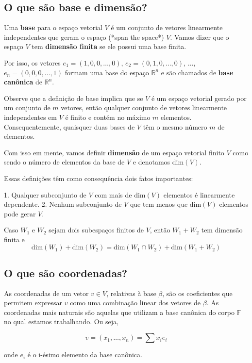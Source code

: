 \documentclass[12pt,a4paper]{article}
\begin{document}
\subsection{O que são base e dimensão?}

Uma \textbf{base} para o espaço vetorial $V$ é um conjunto de vetores linearmente independentes que geram o espaço (*span the space*) $V$. Vamos dizer que o espaço $V$ tem \textbf{dimensão finita} se ele possui uma base finita.

Por isso, os vetores $e_1 = (1,0,0,\ldots,0)$, $e_2 = (0,1,0,\ldots,0)$, $\ldots$, $e_n = (0,0,0,\ldots,1)$ formam uma base do espaço $\mathbb{R}^n$ e são chamados de \textbf{base canônica} de $\mathbb{R}^n$.

Observe que a definição de base implica que se $V$ é um espaço vetorial gerado por um conjunto de $m$ vetores, então qualquer conjunto de vetores linearmente independentes em $V$ é finito e contém no máximo $m$ elementos. Consequentemente, quaisquer duas bases de $V$ têm o mesmo número $m$ de elementos.

Com isso em mente, vamos definir \textbf{dimensão} de um espaço vetorial finito $V$ como sendo o número de elementos da base de $V$ e denotamos $\text{dim}(V)$.

Essas definições têm como consequência dois fatos importantes:

1. Qualquer subconjunto de $V$ com mais de $\text{dim}(V)$ elementos é linearmente dependente.
2. Nenhum subconjunto de $V$ que tem menos que $\text{dim}(V)$  elementos pode gerar $V$.

Caso $W_1$ e $W_2$ sejam dois subespaços finitos de $V$, então $W_1 + W_2$ tem dimensão finita e
$$
\text{dim}(W_1) + \text{dim}(W_2) = \text{dim}(W_1 \cap W_2) + \text{dim}(W_1 + W_2)
$$

\subsection{O que são coordenadas?}

As coordenadas de um vetor $v \in V$, relativas à base $\beta$, são os coeficientes que permitem expressar $v$ como uma combinação linear dos vetores de $\beta$. As coordenadas mais naturais são aquelas que utilizam a base canônica do corpo $\mathbb{F}$ no qual estamos trabalhando. Ou seja, 

$$
v = (x_1, \ldots, x_n) = \sum x_i e_i
$$

onde $e_i$ é o i-ésimo elemento da base canônica.
\end{document}
